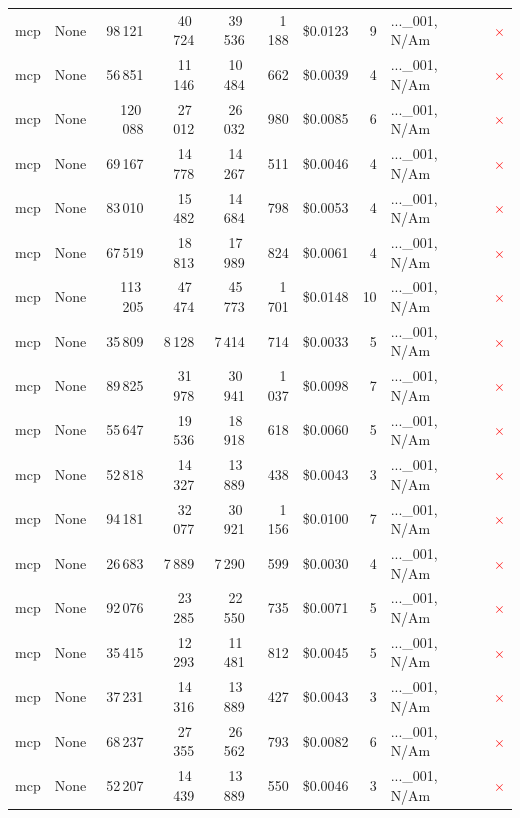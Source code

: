 \documentclass[a4paper,11pt]{article}
\begin{document}
\begin{table}[H]
{\begin{tabular}{l r r r r r r r l c}
mcp & None & 98\,121 & 40\,724 & 39\,536 & 1\,188 & \$0.0123 & 9 & ...\_001, N/Am & \textcolor{red}{\(\times\)} \\
mcp & None & 56\,851 & 11\,146 & 10\,484 & 662 & \$0.0039 & 4 & ...\_001, N/Am & \textcolor{red}{\(\times\)} \\
mcp & None & 120\,088 & 27\,012 & 26\,032 & 980 & \$0.0085 & 6 & ...\_001, N/Am & \textcolor{red}{\(\times\)} \\
mcp & None & 69\,167 & 14\,778 & 14\,267 & 511 & \$0.0046 & 4 & ...\_001, N/Am & \textcolor{red}{\(\times\)} \\
mcp & None & 83\,010 & 15\,482 & 14\,684 & 798 & \$0.0053 & 4 & ...\_001, N/Am & \textcolor{red}{\(\times\)} \\
mcp & None & 67\,519 & 18\,813 & 17\,989 & 824 & \$0.0061 & 4 & ...\_001, N/Am & \textcolor{red}{\(\times\)} \\
mcp & None & 113\,205 & 47\,474 & 45\,773 & 1\,701 & \$0.0148 & 10 & ...\_001, N/Am & \textcolor{red}{\(\times\)} \\
mcp & None & 35\,809 & 8\,128 & 7\,414 & 714 & \$0.0033 & 5 & ...\_001, N/Am & \textcolor{red}{\(\times\)} \\
mcp & None & 89\,825 & 31\,978 & 30\,941 & 1\,037 & \$0.0098 & 7 & ...\_001, N/Am & \textcolor{red}{\(\times\)} \\
mcp & None & 55\,647 & 19\,536 & 18\,918 & 618 & \$0.0060 & 5 & ...\_001, N/Am & \textcolor{red}{\(\times\)} \\
mcp & None & 52\,818 & 14\,327 & 13\,889 & 438 & \$0.0043 & 3 & ...\_001, N/Am & \textcolor{red}{\(\times\)} \\
mcp & None & 94\,181 & 32\,077 & 30\,921 & 1\,156 & \$0.0100 & 7 & ...\_001, N/Am & \textcolor{red}{\(\times\)} \\
mcp & None & 26\,683 & 7\,889 & 7\,290 & 599 & \$0.0030 & 4 & ...\_001, N/Am & \textcolor{red}{\(\times\)} \\
mcp & None & 92\,076 & 23\,285 & 22\,550 & 735 & \$0.0071 & 5 & ...\_001, N/Am & \textcolor{red}{\(\times\)} \\
mcp & None & 35\,415 & 12\,293 & 11\,481 & 812 & \$0.0045 & 5 & ...\_001, N/Am & \textcolor{red}{\(\times\)} \\
mcp & None & 37\,231 & 14\,316 & 13\,889 & 427 & \$0.0043 & 3 & ...\_001, N/Am & \textcolor{red}{\(\times\)} \\
mcp & None & 68\,237 & 27\,355 & 26\,562 & 793 & \$0.0082 & 6 & ...\_001, N/Am & \textcolor{red}{\(\times\)} \\
mcp & None & 52\,207 & 14\,439 & 13\,889 & 550 & \$0.0046 & 3 & ...\_001, N/Am & \textcolor{red}{\(\times\)} \\

\end{tabular}}
\end{table}
\end{document}
